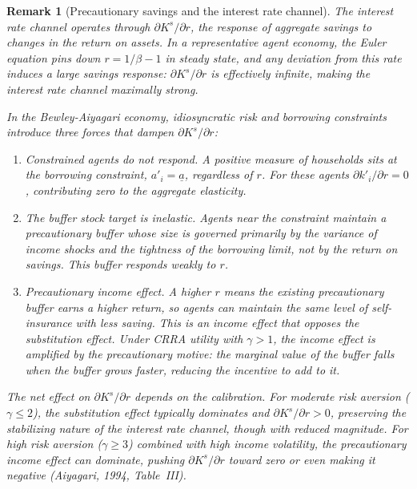 \documentclass[12pt]{article}
\newtheorem{remark}{Remark}
\begin{document}
\begin{remark}[Precautionary savings and the interest rate channel]
\label{rem:precautionary}
The interest rate channel operates through $\partial K^s / \partial r$, the response of aggregate savings to changes in the return on assets. In a representative agent economy, the Euler equation pins down $r = 1/\beta - 1$ in steady state, and any deviation from this rate induces a large savings response: $\partial K^s / \partial r$ is effectively infinite, making the interest rate channel maximally strong.

In the Bewley-Aiyagari economy, idiosyncratic risk and borrowing constraints introduce three forces that dampen $\partial K^s / \partial r$:
\begin{enumerate}[nosep]
    \item \emph{Constrained agents do not respond.} A positive measure of households sits at the borrowing constraint, $a'_i = \underline{a}$, regardless of $r$. For these agents $\partial k'_i / \partial r = 0$, contributing zero to the aggregate elasticity.

    \item \emph{The buffer stock target is inelastic.} Agents near the constraint maintain a precautionary buffer whose size is governed primarily by the variance of income shocks and the tightness of the borrowing limit, not by the return on savings. This buffer responds weakly to $r$.

    \item \emph{Precautionary income effect.} A higher $r$ means the existing precautionary buffer earns a higher return, so agents can maintain the same level of self-insurance with \emph{less} saving. This is an income effect that opposes the substitution effect. Under CRRA utility with $\gamma > 1$, the income effect is amplified by the precautionary motive: the marginal value of the buffer falls when the buffer grows faster, reducing the incentive to add to it.
\end{enumerate}

The net effect on $\partial K^s / \partial r$ depends on the calibration. For moderate risk aversion ($\gamma \leq 2$), the substitution effect typically dominates and $\partial K^s / \partial r > 0$, preserving the stabilizing nature of the interest rate channel, though with reduced magnitude. For high risk aversion ($\gamma \geq 3$) combined with high income volatility, the precautionary income effect can dominate, pushing $\partial K^s / \partial r$ toward zero or even making it negative (Aiyagari, 1994, Table~III).


\end{remark}
\end{document}
